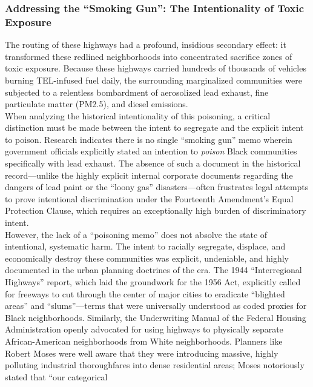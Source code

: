 \documentclass[
]{article}
\begin{document}
\subsubsection{\texorpdfstring{\textbf{Addressing the ``Smoking Gun'':
The Intentionality of Toxic
Exposure}}{Addressing the ``Smoking Gun'': The Intentionality of Toxic Exposure}}\label{addressing-the-smoking-gun-the-intentionality-of-toxic-exposure}

The routing of these highways had a profound, insidious secondary
effect: it transformed these redlined neighborhoods into concentrated
sacrifice zones of toxic exposure. Because these highways carried
hundreds of thousands of vehicles burning TEL-infused fuel daily, the
surrounding marginalized communities were subjected to a relentless
bombardment of aerosolized lead exhaust, fine particulate matter
(PM2.5), and diesel emissions.\\
When analyzing the historical intentionality of this poisoning, a
critical distinction must be made between the intent to segregate and
the explicit intent to poison. Research indicates there is no single
``smoking gun'' memo wherein government officials explicitly stated an
intention to \emph{poison} Black communities specifically with lead
exhaust. The absence of such a document in the historical
record---unlike the highly explicit internal corporate documents
regarding the dangers of lead paint or the ``loony gas''
disasters---often frustrates legal attempts to prove intentional
discrimination under the Fourteenth Amendment's Equal Protection Clause,
which requires an exceptionally high burden of discriminatory intent.\\
However, the lack of a ``poisoning memo'' does not absolve the state of
intentional, systematic harm. The intent to racially segregate,
displace, and economically destroy these communities was explicit,
undeniable, and highly documented in the urban planning doctrines of the
era. The 1944 ``Interregional Highways'' report, which laid the
groundwork for the 1956 Act, explicitly called for freeways to cut
through the center of major cities to eradicate ``blighted areas'' and
``slums''---terms that were universally understood as coded proxies for
Black neighborhoods. Similarly, the Underwriting Manual of the Federal
Housing Administration openly advocated for using highways to physically
separate African-American neighborhoods from White neighborhoods.
Planners like Robert Moses were well aware that they were introducing
massive, highly polluting industrial thoroughfares into dense
residential areas; Moses notoriously stated that ``our categorical
\end{document}
